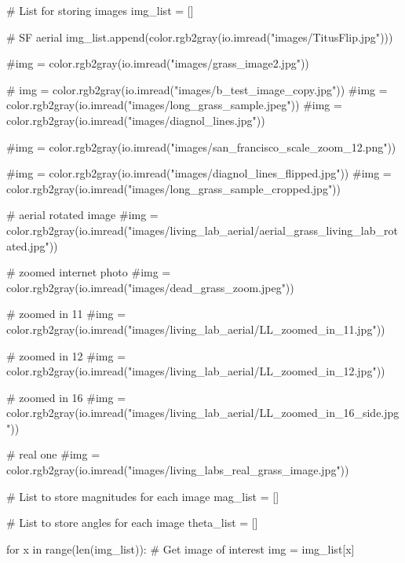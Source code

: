 \documentclass[
  letterpaper,
  DIV=11,
  numbers=noendperiod]{scrreprt}
\newenvironment{Shaded}{\begin{snugshade}}{\end{snugshade}}
\newcommand{\BuiltInTok}[1]{\textcolor[rgb]{0.00,0.23,0.31}{#1}}
\newcommand{\CommentTok}[1]{\textcolor[rgb]{0.37,0.37,0.37}{#1}}
\newcommand{\ControlFlowTok}[1]{\textcolor[rgb]{0.00,0.23,0.31}{#1}}
\newcommand{\KeywordTok}[1]{\textcolor[rgb]{0.00,0.23,0.31}{#1}}
\newcommand{\NormalTok}[1]{\textcolor[rgb]{0.00,0.23,0.31}{#1}}
\newcommand{\OperatorTok}[1]{\textcolor[rgb]{0.37,0.37,0.37}{#1}}
\newcommand{\StringTok}[1]{\textcolor[rgb]{0.13,0.47,0.30}{#1}}
\begin{document}
\begin{Shaded}
\begin{Highlighting}[]
\CommentTok{\# List for storing images}
\NormalTok{img\_list }\OperatorTok{=}\NormalTok{ []}

\CommentTok{\# SF aerial}
\NormalTok{img\_list.append(color.rgb2gray(io.imread(}\StringTok{"images/TitusFlip.jpg"}\NormalTok{)))}


\CommentTok{\#img = color.rgb2gray(io.imread("images/grass\_image2.jpg"))}

\CommentTok{\# img = color.rgb2gray(io.imread("images/b\_test\_image\_copy.jpg"))}
\CommentTok{\#img = color.rgb2gray(io.imread("images/long\_grass\_sample.jpeg"))}
\CommentTok{\#img = color.rgb2gray(io.imread("images/diagnol\_lines.jpg"))}

\CommentTok{\#img = color.rgb2gray(io.imread("images/san\_francisco\_scale\_zoom\_12.png"))}

\CommentTok{\#img = color.rgb2gray(io.imread("images/diagnol\_lines\_flipped.jpg"))}
\CommentTok{\#img = color.rgb2gray(io.imread("images/long\_grass\_sample\_cropped.jpg"))}

\CommentTok{\# aerial rotated image}
\CommentTok{\#img = color.rgb2gray(io.imread("images/living\_lab\_aerial/aerial\_grass\_living\_lab\_rotated.jpg"))}

\CommentTok{\# zoomed internet photo}
\CommentTok{\#img = color.rgb2gray(io.imread("images/dead\_grass\_zoom.jpeg"))}


\CommentTok{\# zoomed in 11}
\CommentTok{\#img = color.rgb2gray(io.imread("images/living\_lab\_aerial/LL\_zoomed\_in\_11.jpg"))}

\CommentTok{\# zoomed in 12}
\CommentTok{\#img = color.rgb2gray(io.imread("images/living\_lab\_aerial/LL\_zoomed\_in\_12.jpg"))}

\CommentTok{\# zoomed in 16}
\CommentTok{\#img = color.rgb2gray(io.imread("images/living\_lab\_aerial/LL\_zoomed\_in\_16\_side.jpg"))}



\CommentTok{\# real one}
\CommentTok{\#img = color.rgb2gray(io.imread("images/living\_labs\_real\_grass\_image.jpg"))}

\CommentTok{\# List to store magnitudes for each image}
\NormalTok{mag\_list }\OperatorTok{=}\NormalTok{ []}

\CommentTok{\# List to store angles for each image}
\NormalTok{theta\_list }\OperatorTok{=}\NormalTok{ []}


\ControlFlowTok{for}\NormalTok{ x }\KeywordTok{in} \BuiltInTok{range}\NormalTok{(}\BuiltInTok{len}\NormalTok{(img\_list)):}
    \CommentTok{\# Get image of interest}
\NormalTok{    img }\OperatorTok{=}\NormalTok{ img\_list[x]}


\end{Highlighting}
\end{Shaded}
\end{document}
